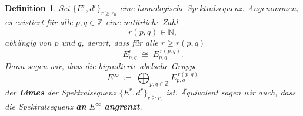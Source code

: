 \documentclass[12pt]{article}
\numberwithin{conj}{section}
\newtheorem{definition}[conj]{Definition}
\newcommand{\Z}{\mathbb{Z}}
\begin{document}
    \begin{definition}
        Sei $\{E^{r}, d^{r}\}_{r \geq r_0}$ eine homologische Spektralsequenz.
        Angenommen, es existiert für alle $p,q \in \Z$ eine natürliche Zahl
        \[
            r(p,q) \in \mathbb{N},
        \]
        abhängig von $p$ und $q$, derart, dass für alle $r \ge r(p,q)$
        \[
            E^{r}_{p,q}\;\cong\; E_{p,q}^{\,r(p,q)}.
        \]
        Dann sagen wir, dass die bigradierte abelsche Gruppe
        \[
            E^{\infty} \;\coloneqq\; \bigoplus_{p,q \in \Z}E_{p,q}^{\,r(p,q)}
        \]
        der \textbf{Limes} der Spektralsequenz $\{E^{r}, d^{r}\}_{r \geq r_0}$ ist.
        Äquivalent sagen wir auch, dass die Spektralsequenz \textbf{an} $E^{\infty}$
        \textbf{angrenzt}.
    \end{definition}
\end{document}
